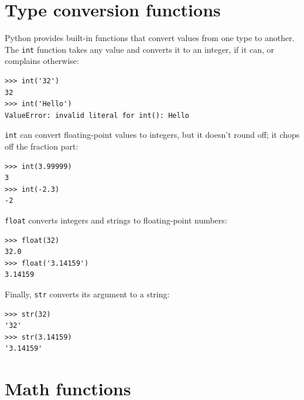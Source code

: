 \documentclass[10pt]{book}
\begin{document}


\section{Type conversion functions}



Python provides built-in functions that convert values
from one type to another.  The {\tt int} function takes any value and
converts it to an integer, if it can, or complains otherwise:


\beforeverb
\begin{verbatim}
>>> int('32')
32
>>> int('Hello')
ValueError: invalid literal for int(): Hello
\end{verbatim}
\afterverb
%
{\tt int} can convert floating-point values to integers, but it
doesn't round off; it chops off the fraction part:

\beforeverb
\begin{verbatim}
>>> int(3.99999)
3
>>> int(-2.3)
-2
\end{verbatim}
\afterverb
%
{\tt float} converts integers and strings to floating-point
numbers:


\beforeverb
\begin{verbatim}
>>> float(32)
32.0
>>> float('3.14159')
3.14159
\end{verbatim}
\afterverb
%
Finally, {\tt str} converts its argument to a string:


\beforeverb
\begin{verbatim}
>>> str(32)
'32'
>>> str(3.14159)
'3.14159'
\end{verbatim}
\afterverb
%



\section{Math functions}
\end{document}
